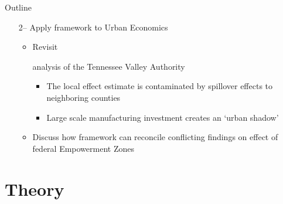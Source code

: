 \documentclass[aspectratio=169]{beamer}
\begin{document}
\begin{frame}{Outline}
    \begin{itemize}
        \item[2--] Apply framework to Urban Economics
        \begin{itemize}
            \item Revisit \begin{citecolor}\citet{Kline_Moretti_2014a}\end{citecolor} analysis of the Tennessee Valley Authority
            
            \begin{itemize}
                \vspace{2.5mm}
                \item The local effect estimate is contaminated by spillover effects to neighboring counties \begin{citecolor}\citep{Kline_Moretti_2014b}\end{citecolor}
                
                \vspace{2.5mm}
                \item Large scale manufacturing investment creates an `urban shadow' \begin{citecolor}\citep{Cuberes_Desmet_Rappaport_2021,Fujita_Krugman_Venables_2001}\end{citecolor}
            \end{itemize}
            
            \vspace{2.5mm}
            \item Discuss how framework can reconcile conflicting findings on effect of federal Empowerment Zones \begin{citecolor}\citep{Busso_Gregory_Kline_2013,Neumark_Kolko_2010}\end{citecolor}
        \end{itemize}
    \end{itemize} 
\end{frame}



\section{Theory}
\end{document}
